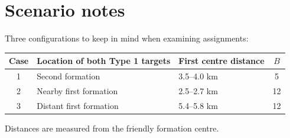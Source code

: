 \documentclass[11pt,a4paper]{article}
\begin{document}
\section{Scenario notes}
Three configurations to keep in mind when examining assignments:
\begin{center}
\begin{tabularx}{\linewidth}{@{}cXlc@{}}
\toprule
Case & Location of both Type 1 targets & First centre distance & $B$ \\
\midrule
1 & Second formation & 3.5--4.0 km & 5 \\
2 & Nearby first formation & 2.5--2.7 km & 12 \\
3 & Distant first formation & 5.4--5.8 km & 12 \\
\bottomrule
\end{tabularx}
\end{center}
Distances are measured from the friendly formation centre.
\end{document}
